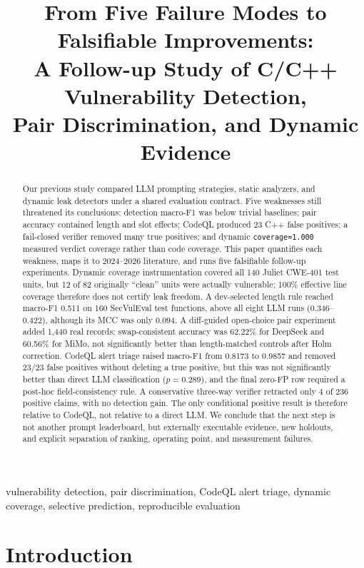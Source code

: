 \documentclass[conference]{IEEEtran}
\title{From Five Failure Modes to Falsifiable Improvements:\\
A Follow-up Study of C/C++ Vulnerability Detection,\\
Pair Discrimination, and Dynamic Evidence}
\author{
\IEEEauthorblockN{Yu Zhang}
\IEEEauthorblockA{CS224 Course Project\\
ShanghaiTech University\\
Shanghai, China\\
\href{mailto:Zhangyu12026@shanghaitech.edu.cn}{Zhangyu12026@shanghaitech.edu.cn}}
}
\begin{document}
\maketitle

\begin{abstract}
Our previous study compared LLM prompting strategies, static analyzers, and dynamic leak detectors under a shared evaluation contract. Five weaknesses still threatened its conclusions: detection macro-F1 was below trivial baselines; pair accuracy contained length and slot effects; CodeQL produced 23 C++ false positives; a fail-closed verifier removed many true positives; and dynamic \texttt{coverage=1.000} measured verdict coverage rather than code coverage. This paper quantifies each weakness, maps it to 2024--2026 literature, and runs five falsifiable follow-up experiments. Dynamic coverage instrumentation covered all 140 Juliet CWE-401 test units, but 12 of 82 originally ``clean'' units were actually vulnerable; 100\% effective line coverage therefore does not certify leak freedom. A dev-selected length rule reached macro-F1 0.511 on 160 SecVulEval test functions, above all eight LLM runs (0.346--0.422), although its MCC was only 0.094. A diff-guided open-choice pair experiment added 1,440 real records; swap-consistent accuracy was 62.22\% for DeepSeek and 60.56\% for MiMo, not significantly better than length-matched controls after Holm correction. CodeQL alert triage raised macro-F1 from 0.8173 to 0.9857 and removed 23/23 false positives without deleting a true positive, but this was not significantly better than direct LLM classification ($p=0.289$), and the final zero-FP row required a post-hoc field-consistency rule. A conservative three-way verifier retracted only 4 of 236 positive claims, with no detection gain. The only conditional positive result is therefore relative to CodeQL, not relative to a direct LLM. We conclude that the next step is not another prompt leaderboard, but externally executable evidence, new holdouts, and explicit separation of ranking, operating point, and measurement failures.
\end{abstract}

\begin{IEEEkeywords}
vulnerability detection, pair discrimination, CodeQL alert triage, dynamic coverage, selective prediction, reproducible evaluation
\end{IEEEkeywords}

\section{Introduction}
\label{sec:intro}
\end{document}
